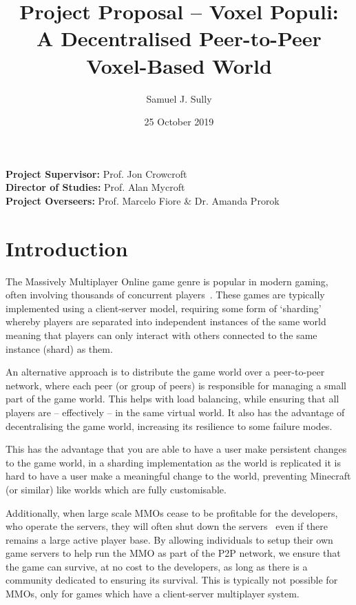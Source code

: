 \documentclass[11pt,a4paper]{article}
\begin{document}
	\title{Project Proposal -- Voxel Populi:\\ A Decentralised Peer-to-Peer Voxel-Based World}
	\author{Samuel J. Sully}
	\date{25 October 2019}
	{\let\newpage\relax\maketitle}
	\thispagestyle{empty}
	
	\noindent
	\textbf{Project Supervisor:} Prof. Jon Crowcroft\\
	\textbf{Director of Studies:} Prof. Alan Mycroft\\
	\textbf{Project Overseers:} Prof. Marcelo Fiore \&  Dr. Amanda Prorok

	\section*{Introduction}
	
	The Massively Multiplayer Online game genre is popular in modern gaming, often involving thousands of concurrent players~\cite{wowstat}. These games are typically implemented using a client-server model, requiring some form of `sharding'~\cite{shard} whereby players are separated into independent instances of the same world meaning that players can only interact with others connected to the same instance (shard) as them.
	
	An alternative approach is to distribute the game world over a peer-to-peer network, where each peer (or group of peers) is responsible for managing a small part of the game world. This helps with load balancing, while ensuring that all players are -- effectively -- in the same virtual world. It also has the advantage of decentralising the game world, increasing its resilience to some failure modes.
	
	This has the advantage that you are able to have a user make persistent changes to the game world, in a sharding implementation as the world is replicated it is hard to have a user make a meaningful change to the world, preventing Minecraft (or similar) like worlds which are fully customisable.
	
	Additionally, when large scale MMOs cease to be profitable for the developers, who operate the servers, they will often shut down the servers~\cite{down} even if there remains a large active player base. By allowing individuals to setup their own game servers to help run the MMO as part of the P2P network, we ensure that the game can survive, at no cost to the developers, as long as there is a community dedicated to ensuring its survival. This is typically not possible for MMOs, only for games which have a client-server multiplayer system.
	
\end{document}
